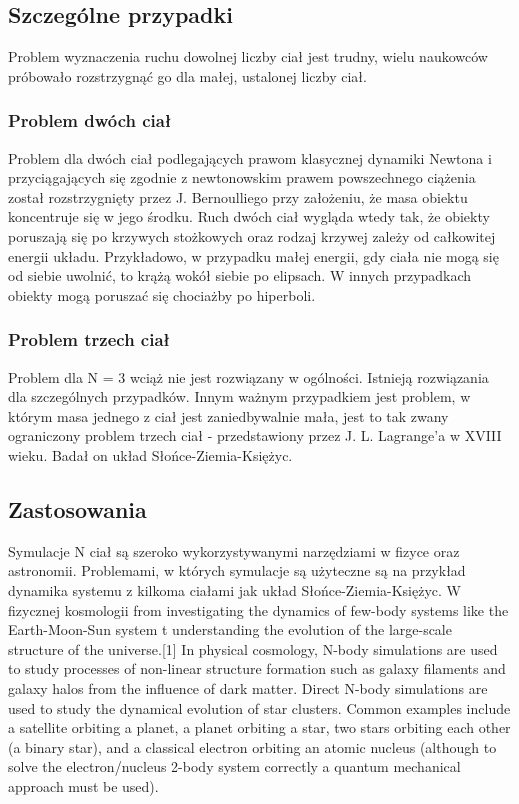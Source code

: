 \documentclass[14pt,twoside,a4paper]{article}
\begin{document}
\subsection{\Large Szczególne przypadki}
\bigskip
Problem wyznaczenia ruchu dowolnej liczby ciał jest trudny, wielu naukowców próbowało rozstrzygnąć go dla małej, ustalonej liczby ciał.

\subsubsection{Problem dwóch ciał}
Problem dla dwóch ciał podlegających prawom klasycznej dynamiki Newtona i przyciągających się zgodnie z newtonowskim prawem powszechnego ciążenia został rozstrzygnięty przez J. Bernoulliego przy założeniu, że masa obiektu koncentruje się w jego środku. \cite{fund}
Ruch dwóch ciał wygląda wtedy tak, że obiekty poruszają się po krzywych stożkowych oraz rodzaj krzywej zależy od całkowitej energii układu. Przykładowo, w przypadku małej energii, gdy ciała nie mogą się od siebie uwolnić, to krążą wokół siebie po elipsach. W innych przypadkach obiekty mogą poruszać się chociażby po hiperboli. 

\subsubsection{Problem trzech ciał}
Problem dla N = 3 wciąż nie jest rozwiązany w ogólności. Istnieją rozwiązania dla szczególnych przypadków\cite{threebody1, threebody2}. Innym ważnym przypadkiem jest problem, w którym masa jednego z ciał jest zaniedbywalnie mała, jest to tak zwany ograniczony problem trzech ciał - przedstawiony przez J. L. Lagrange'a w XVIII wieku. Badał on układ Słońce-Ziemia-Księżyc. 


\subsection{\Large Zastosowania}
\bigskip
Symulacje N ciał są szeroko wykorzystywanymi narzędziami w fizyce oraz astronomii. 
Problemami, w których symulacje są użyteczne są na przykład dynamika systemu z kilkoma ciałami jak 
układ Słońce-Ziemia-Księżyc. W fizycznej kosmologii 
from investigating the dynamics of few-body systems like the Earth-Moon-Sun system t understanding the evolution of the large-scale structure of the universe.[1] In physical cosmology, N-body simulations are used to study processes of non-linear structure formation such as galaxy filaments and galaxy halos from the influence of dark matter. Direct N-body simulations are used to study the dynamical evolution of star clusters. Common examples include a satellite orbiting a planet, a planet orbiting a star, two stars orbiting each other (a binary star), and a classical electron orbiting an atomic nucleus (although to solve the electron/nucleus 2-body system correctly a quantum mechanical approach must be used).
\end{document}
